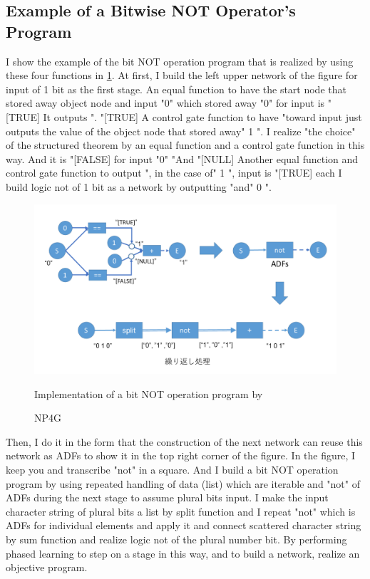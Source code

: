 \documentclass{article}
\begin{document}
\subsection {Example of a Bitwise NOT Operator's Program}
I show the example of the bit NOT operation program that is realized by using these four functions in \ref{fig:bitwise_not}.
At first, I build the left upper network of the figure for input of 1 bit as the first stage.
An equal function to have the start node that stored away object node and input "0" which stored away "0" for input is "[TRUE]
It outputs ".
"[TRUE]
A control gate function to have "toward input just outputs the value of the object node that stored away" 1 ".
I realize "the choice" of the structured theorem by an equal function and a control gate function in this way.
And it is "[FALSE] for input "0"
"And "[NULL]
Another equal function and control gate function to output ", in the case of" 1 ", input is "[TRUE] each
I build logic not of 1 bit as a network by outputting "and" 0 ".
\begin{figure}[t]
\begin{center}
\includegraphics[width=150mm]{bitwise_not.png}
\end{center}
Implementation of a bit NOT operation program by \caption{NP4G}
\label{fig:bitwise_not}
\end{figure}
Then, I do it in the form that the construction of the next network can reuse this network as ADFs to show it in the top right corner of the figure.
In the figure, I keep you and transcribe "not" in a square.
And I build a bit NOT operation program by using repeated handling of data (list) which are iterable and "not" of ADFs during the next stage to assume plural bits input.
I make the input character string of plural bits a list by split function and I repeat "not" which is ADFs for individual elements and apply it and connect scattered character string by sum function and realize logic not of the plural number bit.
By performing phased learning to step on a stage in this way, and to build a network, realize an objective program.
\end{document}
